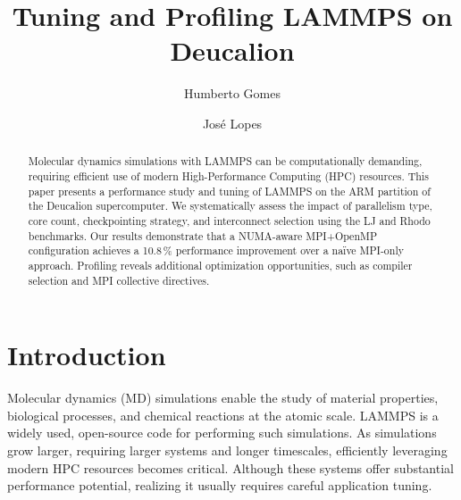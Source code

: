 \documentclass[sigplan, nonacm, screen]{acmart}
\begin{document}

\title{Tuning and Profiling LAMMPS on Deucalion}

\author{Humberto Gomes}

\author{José Lopes}

\begin{abstract} %

    Molecular dynamics simulations with LAMMPS can be computationally demanding, requiring efficient
    use of modern High-Performance Computing (HPC) resources. This paper presents a performance
    study and tuning of LAMMPS on the ARM partition of the Deucalion supercomputer. We
    systematically assess the impact of parallelism type, core count, checkpointing strategy, and
    interconnect selection using the LJ and Rhodo benchmarks. Our results demonstrate that a
    NUMA-aware MPI+OpenMP configuration achieves a 10.8\,\% performance improvement over a naïve
    MPI-only approach. Profiling reveals additional optimization opportunities, such as compiler
    selection and MPI collective directives.

\end{abstract}

\maketitle

\section{Introduction} %
\label{introduction}

Molecular dynamics (MD) simulations enable the study of material properties, biological processes,
and chemical reactions at the atomic scale. LAMMPS \cite{lammps} is a widely used, open-source code
for performing such simulations. As simulations grow larger, requiring larger systems and longer
timescales, efficiently leveraging modern HPC resources becomes critical. Although these systems
offer substantial performance potential, realizing it usually requires careful application tuning.
\end{document}
